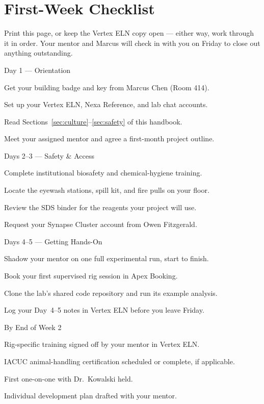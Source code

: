 \section{First-Week Checklist}
\label{sec:checklist}

Print this page, or keep the Vertex ELN copy open --- either way, work through it in order.
Your mentor and Marcus will check in with you on Friday to close out anything outstanding.

\begin{daybox}{Day 1 --- Orientation}
\begin{checklist}
  \item Get your building badge and key from Marcus Chen (Room 414).
  \item Set up your Vertex ELN, Nexa Reference, and lab chat accounts.
  \item Read Sections~\ref{sec:culture}--\ref{sec:safety} of this handbook.
  \item Meet your assigned mentor and agree a first-month project outline.
\end{checklist}
\end{daybox}

\begin{daybox}{Days 2--3 --- Safety \& Access}
\begin{checklist}
  \item Complete institutional biosafety and chemical-hygiene training.
  \item Locate the eyewash stations, spill kit, and fire pulls on your floor.
  \item Review the SDS binder for the reagents your project will use.
  \item Request your Synapse Cluster account from Owen Fitzgerald.
\end{checklist}
\end{daybox}

\begin{daybox}{Days 4--5 --- Getting Hands-On}
\begin{checklist}
  \item Shadow your mentor on one full experimental run, start to finish.
  \item Book your first supervised rig session in Apex Booking.
  \item Clone the lab's shared code repository and run its example analysis.
  \item Log your Day~4--5 notes in Vertex ELN before you leave Friday.
\end{checklist}
\end{daybox}

\begin{daybox}{By End of Week 2}
\begin{checklist}
  \item Rig-specific training signed off by your mentor in Vertex ELN.
  \item IACUC animal-handling certification scheduled or complete, if applicable.
  \item First one-on-one with Dr.\ Kowalski held.
  \item Individual development plan drafted with your mentor.
\end{checklist}
\end{daybox}
